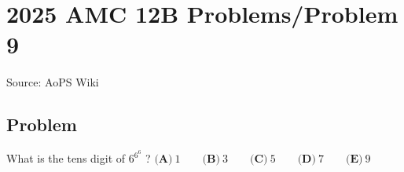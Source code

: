 \documentclass[12pt]{article}
\begin{document}
\section*{{2025 AMC 12B Problems/Problem 9}}
Source: AoPS Wiki

\subsection*{Problem}
What is the tens digit of $6^{6^6}$ ? $\textbf{(A)}~1 \qquad \textbf{(B)}~3 \qquad \textbf{(C)}~5 \qquad \textbf{(D)}~7 \qquad \textbf{(E)}~9$
\end{document}
